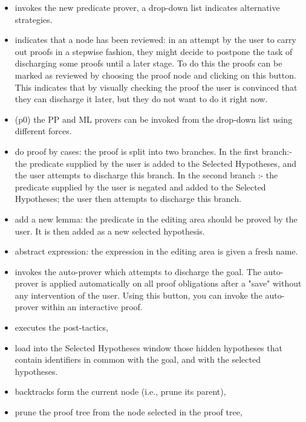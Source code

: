 \begin{itemize}
    \item {} invokes the new predicate prover, a drop-down list indicates alternative strategies.
    \item {} indicates that a node has been reviewed: in an attempt by the user to carry out proofs in a stepwise fashion, they might decide to postpone the task of discharging some proofs until a later stage. To do this the proofs can be marked as reviewed by choosing the proof node and clicking on this button. This indicates that by visually checking the proof the user is convinced that they can discharge it later, but they do not want to do it right now.
    \item (p0) the PP and ML provers can be invoked from the drop-down list using different forces.
    \item {} do proof by cases: the proof is split into two branches. In the first branch:- the predicate supplied by the user is added to the Selected Hypotheses, and the user attempts to discharge this branch. In the second branch :- the predicate supplied by the user is negated and added to the Selected Hypotheses; the user then attempts to discharge this branch. 
    \item {} add a new lemma: the predicate in the editing area should be proved by the user. It is then added as a new selected hypothesis.
    \item {} abstract expression: the expression in the editing area is given a fresh name.
    \item {} invokes the auto-prover which attempts to discharge the goal. The auto-prover is applied automatically on all proof obligations after a "save" without any intervention of the user. Using this button, you can invoke the auto-prover within an interactive proof.
    \item {} executes the post-tactics,
    \item {} load into the Selected Hypotheses window those hidden hypotheses that contain identifiers in common with the goal, and with the selected hypotheses.
    \item {} backtracks form the current node (i.e., prune its parent),
    \item {} prune the proof tree from the node selected in the proof tree,

\end{itemize}
